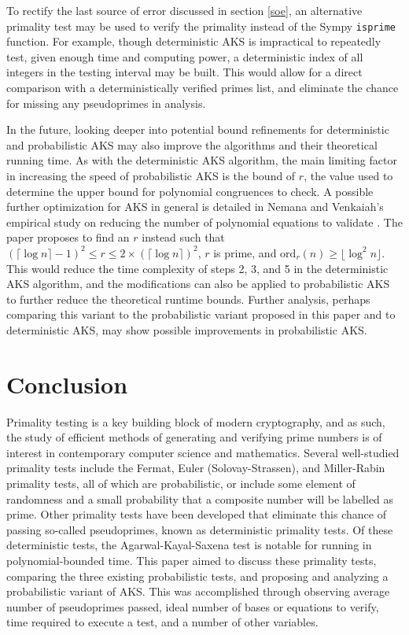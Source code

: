 \documentclass{article}
\begin{document}
To rectify the last source of error discussed in section \ref{soe}, an alternative primality test may be used to verify the primality instead of the Sympy \texttt{isprime} function. For example, though deterministic AKS is impractical to repeatedly test, given enough time and computing power, a deterministic index of all integers in the testing interval may be built. This would allow for a direct comparison with a deterministically verified primes list, and eliminate the chance for missing any pseudoprimes in analysis.

In the future, looking deeper into potential bound refinements for deterministic and probabilistic AKS may also improve the algorithms and their theoretical running time. As with the deterministic AKS algorithm, the main limiting factor in increasing the speed of probabilistic AKS is the bound of $r$, the value used to determine the upper bound for polynomial congruences to check. A possible further optimization for AKS in general is detailed in Nemana and Venkaiah's empirical study on reducing the number of polynomial equations to validate \cite{nemana_empirical_2016}. The paper proposes to find an $r$ instead such that $(\lceil \log{n} \rceil - 1)^2 \leq r \leq 2 \times (\lceil \log{n} \rceil)^2$, $r$ is prime, and $\textrm{ord}_r(n) \geq \lfloor \log^2{n} \rfloor$. This would reduce the time complexity of steps 2, 3, and 5 in the deterministic AKS algorithm, and the modifications can also be applied to probabilistic AKS to further reduce the theoretical runtime bounds. Further analysis, perhaps comparing this variant to the probabilistic variant proposed in this paper and to deterministic AKS, may show possible improvements in probabilistic AKS.

\section{Conclusion}
Primality testing is a key building block of modern cryptography, and as such, the study of efficient methods of generating and verifying prime numbers is of interest in contemporary computer science and mathematics. Several well-studied primality tests include the Fermat, Euler (Solovay-Strassen), and Miller-Rabin primality tests, all of which are probabilistic, or include some element of randomness and a small probability that a composite number will be labelled as prime. Other primality tests have been developed that eliminate this chance of passing so-called pseudoprimes, known as deterministic primality tests. Of these deterministic tests, the Agarwal-Kayal-Saxena test is notable for running in polynomial-bounded time. This paper aimed to discuss these primality tests, comparing the three existing probabilistic tests, and proposing and analyzing a probabilistic variant of AKS. This was accomplished through observing average number of pseudoprimes passed, ideal number of bases or equations to verify, time required to execute a test, and a number of other variables.
\end{document}
